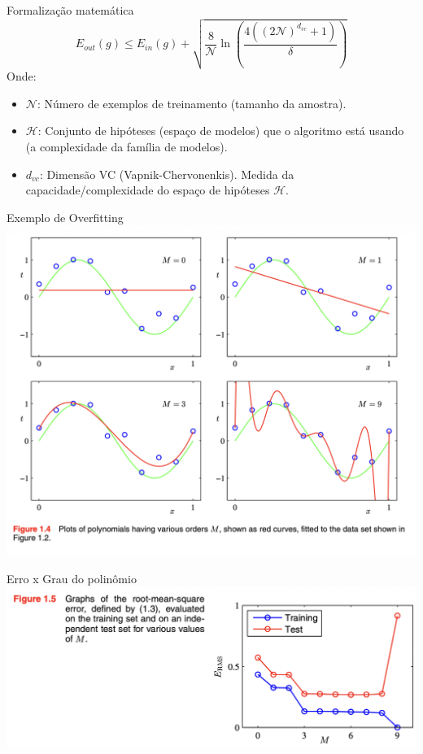 \documentclass{beamer}
\begin{document}
\begin{frame}{Formalização matemática}
    \begin{equation*}
        E_{out}(g) \le E_{in}(g) + \sqrt{\frac{8}{\mathcal{N}} \ln \left( \frac{4((2\mathcal{N})^{d_{vc}} + 1)}{\delta} \right)}
    \end{equation*}
    Onde:
    \begin{itemize}
        \item $\mathcal{N}$: Número de exemplos de treinamento (tamanho da amostra).
        \item $\mathcal{H}$: Conjunto de hipóteses (espaço de modelos) que o algoritmo está usando (a complexidade da família de modelos).
        \item $d_{vc}$: Dimensão VC (Vapnik-Chervonenkis). Medida da capacidade/complexidade do espaço de hipóteses $\mathcal{H}$.
    \end{itemize}
\end{frame}

\begin{frame}{Exemplo de Overfitting}
\centering
\includegraphics[width=\textwidth,height=0.8\textheight,keepaspectratio]{imgs/bishop_example/1.png}
\end{frame}

\begin{frame}{Erro x Grau do polinômio}
    \centering
    \includegraphics[width=\textwidth,height=0.8\textheight,keepaspectratio]{imgs/bishop_example/2.png}
\end{frame}
\end{document}
